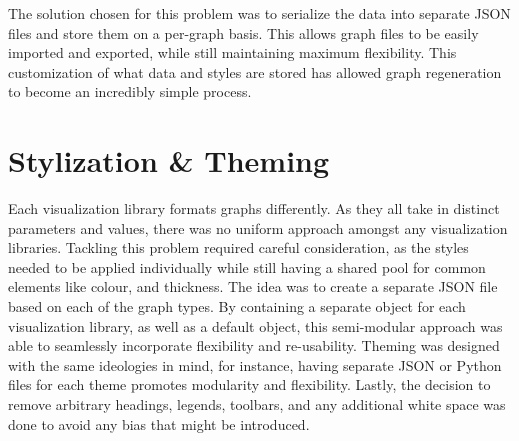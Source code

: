 The solution chosen for this problem was to serialize the data into separate JSON files and store them on a per-graph basis. This allows graph files to be easily imported and exported, while still maintaining maximum flexibility. This customization of what data and styles are stored has allowed graph regeneration to become an incredibly simple process.

\section{Stylization \& Theming}
Each visualization library formats graphs differently. As they all take in distinct parameters and values, there was no uniform approach amongst any visualization libraries. Tackling this problem required careful consideration, as the styles needed to be applied individually while still having a shared pool for common elements like colour, and thickness. The idea was to create a separate JSON file based on each of the graph types. By containing a separate object for each visualization library, as well as a default object, this semi-modular approach was able to seamlessly incorporate flexibility and re-usability. Theming was designed with the same ideologies in mind, for instance, having separate JSON or Python files for each theme promotes modularity and flexibility. Lastly, the decision to remove arbitrary headings, legends, toolbars, and any additional white space was done to avoid any bias that might be introduced.



